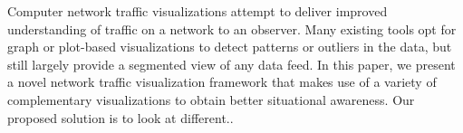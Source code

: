 Computer network traffic visualizations attempt to deliver improved understanding of traffic on a network to an observer. 
Many existing tools opt for graph or plot-based visualizations to detect patterns or outliers in the data, but still largely
provide a segmented view of any data feed. In this paper, we present a novel network traffic visualization framework that 
makes use of a variety of complementary visualizations to obtain better situational awareness. 
Our proposed solution is to look at different..